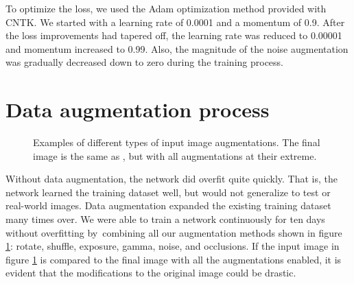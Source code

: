To optimize the loss, we used the Adam optimization method \cite{Kingma2015} provided with \ac{CNTK}. We started with a learning rate of 0.0001 and a momentum of 0.9. After the loss improvements had tapered off, the learning rate was reduced to 0.00001 and momentum increased to 0.99. Also, the magnitude of the noise augmentation was gradually decreased down to zero during the training process.

\section{Data augmentation process}
\label{sec:data_aug}

\begin{figure}
    \hfill
    \hfill
    \hfill
    
    \hfill
    \hfill
    \hfill
    
    \centering
    \caption[Input image augmentations]{Examples of different types of input image augmentations. The final image \protect{} is the same as \protect{}, but with all augmentations at their extreme.}
    \label{fig:augmentations_1}
\end{figure}

Without data augmentation, the network did overfit quite quickly. That is, the network learned the training dataset well, but would not generalize to test or real-world images. Data augmentation expanded the existing training dataset many times over. We were able to train a network continuously for ten days without overfitting by combining all our augmentation methods shown in figure \ref{fig:augmentations_1}: rotate, shuffle, exposure, gamma, noise, and occlusions. If the input image in figure \ref{fig:augmentations_1} is compared to the final image with all the augmentations enabled, it is evident that the modifications to the original image could be drastic.

